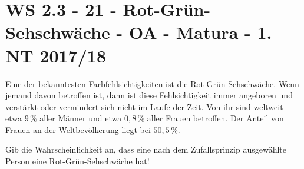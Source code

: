 \section{WS 2.3 - 21 - Rot-Grün-Sehschwäche - OA - Matura - 1. NT 2017/18}

\begin{beispiel}[WS 2.3]{1}
Eine der bekanntesten Farbfehlsichtigkeiten ist die Rot-Grün-Sehschwäche. Wenn jemand davon betroffen ist, dann ist diese Fehlsichtigkeit immer angeboren und verstärkt oder vermindert sich nicht im Laufe der Zeit. Von ihr sind weltweit etwa $9\,\%$ aller Männer und etwa $0,8\,\%$ aller Frauen betroffen. Der Anteil von Frauen an der Weltbevölkerung liegt bei $50,5\,\%$.

Gib die Wahrscheinlichkeit an, dass eine nach dem Zufallsprinzip ausgewählte Person eine Rot-Grün-Sehschwäche hat!

\end{beispiel}